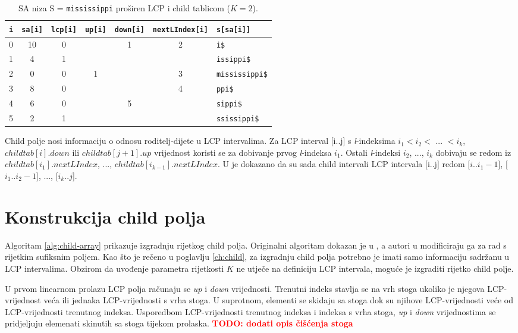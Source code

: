 \documentclass[times, utf8, seminar, numeric]{fer}
\newcommand\todo[1]{\textbf{\textcolor{red}{TODO: #1}}}
\begin{document}
\begin{table}[h]
	\centering
  \caption{SA  niza S = \texttt{mississippi} proširen LCP i child tablicom ($K = 2$).}
	\label{tbl:example}
	
	\begin{tabular}{ccccccl}
		\hline
    \texttt{i} & \texttt{sa[i]} & \texttt{lcp[i]} & \texttt{up[i]} & \texttt{down[i]} & \texttt{nextLIndex[i]} & \texttt{s[sa[i]]} \\ \hline
    0 & 10 &  0 &    &  1 &  2 & \texttt{i\$}           \\
    1 &  4 &  1 &    &    &    & \texttt{issippi\$}     \\
    2 &  0 &  0 &  1 &    &  3 & \texttt{mississippi\$} \\
    3 &  8 &  0 &    &    &  4 & \texttt{ppi\$}         \\
    4 &  6 &  0 &    &  5 &    & \texttt{sippi\$}       \\
    5 &  2 &  1 &    &    &    & \texttt{ssissippi\$}   \\ \hline
	\end{tabular}
\end{table}

Child polje nosi informaciju o odnosu roditelj-dijete u LCP intervalima. Za LCP interval [i..j] s \textit{l}-indeksima $i_1 < i _2 <$ ... $< i_k$, $childtab[i].down$ ili $childtab[j+1].up$ vrijednost koristi se za dobivanje prvog \textit{l}-indeksa $i_1$. Ostali \textit{l}-indeksi $i _2$, ..., $i_k$ dobivaju se redom iz $childtab[i_1].nextLIndex$, ..., $childtab[i_{k-1}].nextLIndex$. U \cite{esa} je dokazano da su sada child intervali LCP intervala [i..j] redom [$i..i_1-1$], [$i_1..i_2-1$], ..., [$i_k..j$].

\section{Konstrukcija child polja}

Algoritam \ref{alg:child-array} prikazuje izgradnju rijetkog child polja. Originalni algoritam dokazan je u \cite{esa}, a autori u \cite{essa} modificiraju ga za rad s rijetkim sufiksnim poljem. Kao što je rečeno u poglavlju \ref{ch:child}, za izgradnju child polja potrebno je imati samo informaciju sadržanu u LCP intervalima. Obzirom da uvođenje parametra rijetkosti $K$ ne utječe na definiciju LCP intervala, moguće je izgraditi rijetko child polje.

U prvom linearnom prolazu LCP polja računaju se \textit{up} i \textit{down} vrijednosti. Trenutni indeks stavlja se na vrh stoga ukoliko je njegova LCP-vrijednost veća ili jednaka LCP-vrijednosti s vrha stoga. U suprotnom, elementi se skidaju sa stoga dok su njihove LCP-vrijednosti veće od LCP-vrijednosti trenutnog indeksa. Usporedbom LCP-vrijednosti trenutnog indeksa i indeksa s vrha stoga, \textit{up} i \textit{down} vrijednostima se pridjeljuju elemenati skinutih sa stoga tijekom prolaska. \todo{dodati opis čišćenja stoga}
\end{document}
